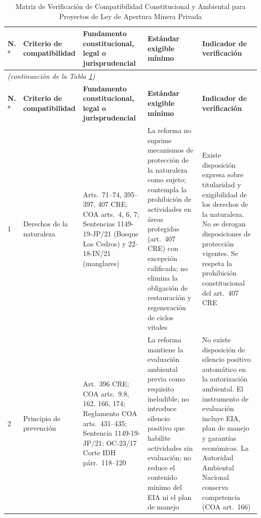
\begingroup
\small
\begin{longtable}{|p{}|p{}|p{}|p{}|p{}|}

\caption{Matriz de Verificación de Compatibilidad Constitucional y Ambiental para Proyectos de Ley de Apertura Minera Privada}
\label{tab:compatibilidad} \\

\hline
\textbf{N.°} & \textbf{Criterio de compatibilidad} & \textbf{Fundamento constitucional, legal o jurisprudencial} & \textbf{Estándar exigible mínimo} & \textbf{Indicador de verificación} \\
\hline
\endfirsthead

\multicolumn{5}{l}{\small\textit{(continuación de la Tabla \ref*{tab:compatibilidad})}} \\[2pt]
\hline
\textbf{N.°} & \textbf{Criterio de compatibilidad} & \textbf{Fundamento constitucional, legal o jurisprudencial} & \textbf{Estándar exigible mínimo} & \textbf{Indicador de verificación} \\
\hline
\endhead

\hline
\endfoot

1 &
Derechos de la naturaleza &
Arts.\ 71--74, 395--397, 407 CRE; COA arts.\ 4, 6, 7; Sentencias 1149-19-JP/21 (Bosque Los Cedros) y 22-18-IN/21 (manglares) &
La reforma no suprime mecanismos de protección de la naturaleza como sujeto; contempla la prohibición de actividades en áreas protegidas (art.\ 407 CRE) con excepción calificada; no elimina la obligación de restauración y regeneración de ciclos vitales &
Existe disposición expresa sobre titularidad y exigibilidad de los derechos de la naturaleza. No se derogan disposiciones de protección vigentes. Se respeta la prohibición constitucional del art.\ 407 CRE \\
\hline

2 &
Principio de prevención &
Art.\ 396 CRE; COA arts.\ 9.8, 162, 166, 174; Reglamento COA arts.\ 431--435; Sentencia 1149-19-JP/21; OC-23/17 Corte IDH párr.\ 118--120 &
La reforma mantiene la evaluación ambiental previa como requisito ineludible; no introduce silencio positivo que habilite actividades sin evaluación; no reduce el contenido mínimo del EIA ni el plan de manejo &
No existe disposición de silencio positivo automático en la autorización ambiental. El instrumento de evaluación incluye EIA, plan de manejo y garantías económicas. La Autoridad Ambiental Nacional conserva competencia (COA art.\ 166) \\
\hline


\end{longtable}
